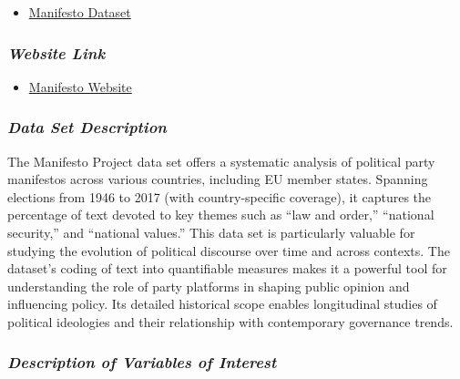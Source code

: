 \documentclass[
]{article}
\providecommand{\tightlist}{%
  \setlength{\itemsep}{0pt}\setlength{\parskip}{0pt}}\usepackage{longtable,booktabs,array}
\begin{document}
\begin{itemize}
\tightlist
\item
  \href{https://manifesto-project.wzb.eu/down/data/2024a/datasets/MPDataset_MPDS2024a.csv}{Manifesto
  Dataset}
\end{itemize}

\subsubsection{\texorpdfstring{\emph{Website
Link}}{Website Link}}\label{website-link-2}

\begin{itemize}
\tightlist
\item
  \href{https://manifesto-project.wzb.eu/datasets}{Manifesto Website}
\end{itemize}

\subsubsection{\texorpdfstring{\emph{Data Set
Description}}{Data Set Description}}\label{data-set-description-2}

The Manifesto Project data set offers a systematic analysis of political
party manifestos across various countries, including EU member states.
Spanning elections from 1946 to 2017 (with country-specific coverage),
it captures the percentage of text devoted to key themes such as ``law
and order,'' ``national security,'' and ``national values.'' This data
set is particularly valuable for studying the evolution of political
discourse over time and across contexts. The dataset's coding of text
into quantifiable measures makes it a powerful tool for understanding
the role of party platforms in shaping public opinion and influencing
policy. Its detailed historical scope enables longitudinal studies of
political ideologies and their relationship with contemporary governance
trends.

\subsubsection{\texorpdfstring{\emph{Description of Variables of
Interest}}{Description of Variables of Interest}}\label{description-of-variables-of-interest-2}
\end{document}
